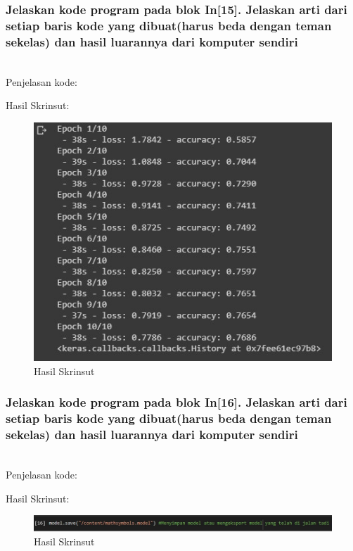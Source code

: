 \subsubsection{Jelaskan kode program pada blok  In[15]. Jelaskan arti dari setiap baris kode yang dibuat(harus beda dengan teman sekelas) dan hasil luarannya dari komputer sendiri}
\hfill\\
Penjelasan kode:

Hasil Skrinsut:
\begin{figure}[H]
	\centering
	\includegraphics[scale=0.5]{figures/1174083/figures7/p15.png}
	\caption{Hasil Skrinsut}
\end{figure}


\subsubsection{Jelaskan kode program pada blok  In[16]. Jelaskan arti dari setiap baris kode yang dibuat(harus beda dengan teman sekelas) dan hasil luarannya dari komputer sendiri}
\hfill\\
Penjelasan kode:

Hasil Skrinsut:
\begin{figure}[H]
	\centering
	\includegraphics[scale=0.5]{figures/1174083/figures7/p16.png}
	\caption{Hasil Skrinsut}
\end{figure}


